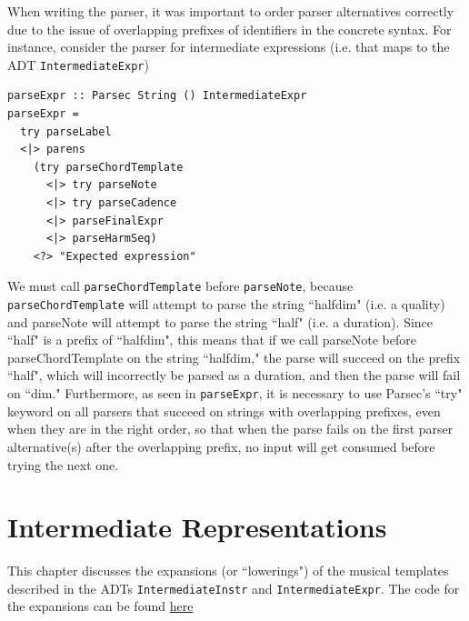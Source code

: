 \documentclass{report}
\begin{document}
When writing the parser, it was important to order parser alternatives correctly due to the issue of overlapping prefixes of identifiers in the concrete syntax. For instance, consider the parser for intermediate expressions (i.e. that maps to the ADT \verb.IntermediateExpr.)

\begin{verbatim}
parseExpr :: Parsec String () IntermediateExpr
parseExpr = 
  try parseLabel
  <|> parens 
    (try parseChordTemplate 
      <|> try parseNote
      <|> try parseCadence
      <|> parseFinalExpr
      <|> parseHarmSeq)
    <?> "Expected expression"
\end{verbatim}

We must call \verb.parseChordTemplate. before \verb.parseNote., because \verb.parseChordTemplate. will attempt to parse the string ``halfdim" (i.e. a quality) and parseNote will attempt to parse the string ``half" (i.e. a duration). Since ``half" is a prefix of ``halfdim", this means that if we call parseNote before parseChordTemplate on the string ``halfdim," the parse will succeed on the prefix ``half", which will incorrectly be parsed as a duration, and then the parse will fail on ``dim." Furthermore, as seen in \verb.parseExpr., it is necessary to use Parsec's ``try" keyword on all parsers that succeed on strings with overlapping prefixes, even when they are in the right order, so that when the parse fails on the first parser alternative(s) after the overlapping prefix, no input will get consumed before trying the next one.

\chapter{Intermediate Representations}
\label{chap:ir}
This chapter discusses the expansions (or ``lowerings") of the musical templates described in the ADTs \verb.IntermediateInstr. and \verb.IntermediateExpr.. The code for the expansions can be found \href{https://github.com/ilanashapiro/MusAssist/blob/main/app/IRConversion.hs}{here}

\end{document}
